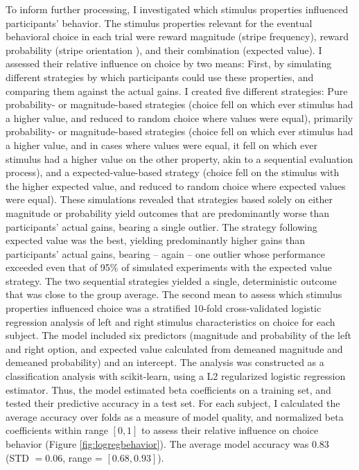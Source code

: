 To inform further processing, I investigated which stimulus properties influenced participants' behavior.
The stimulus properties relevant for the eventual behavioral choice in each trial were reward magnitude (stripe frequency), reward probability (stripe orientation ), and their combination (expected value).
I assessed their relative influence on choice by two means: First, by simulating different strategies by which participants could use these properties, and comparing them against the actual gains.
I created five different strategies: Pure probability- or magnitude-based strategies (choice fell on which ever stimulus had a higher value, and reduced to random choice where values were equal), primarily probability- or magnitude-based strategies (choice fell on which ever stimulus had a higher value, and in cases where values were equal, it fell on which ever stimulus had a higher value on the other property, akin to a sequential evaluation process), and a expected-value-based strategy (choice fell on the stimulus with the higher expected value, and reduced to random choice where expected values were equal).
These simulations revealed that strategies based solely on either magnitude or probability yield outcomes that are predominantly worse than participants' actual gains, bearing a single outlier.
The strategy following expected value was the best, yielding predominantly higher gains than participants' actual gains, bearing -- again -- one outlier whose performance exceeded even that of 95\% of simulated experiments with the expected value strategy.
The two sequential strategies yielded a single, deterministic outcome that was close to the group average.
The second mean to assess which stimulus properties influenced choice was a stratified 10-fold cross-validated logistic regression analysis of left and right stimulus characteristics on choice for each subject.
The model included six predictors (magnitude and probability of the left and right option, and expected value calculated from demeaned magnitude and demeaned probability) and an intercept.
The analysis was constructed as a classification analysis with scikit-learn, using a L2 regularized logistic regression estimator.
Thus, the model estimated beta coefficients on a training set, and tested their predictive accuracy in a test set.
For each subject, I calculated the average accuracy over folds as a measure of model quality, and normalized beta coefficients within range $[0, 1]$ to assess their relative influence on choice behavior (Figure \ref{fig:logregbehavior}).
The average model accuracy was $0.83$ (STD $=0.06$, range = $[0.68, 0.93]$).
